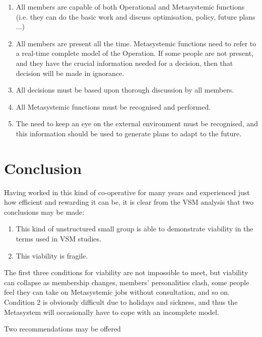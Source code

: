 \begin{enumerate}
  \item All members are capable of both Operational and Metasystemic functions
(i.e. they can do the basic work and discuss optimisation, policy, future plans ...)

  \item All members are present all the time. Metasystemic functions need to refer to a real-time complete model of the Operation. If some people are not present, and they have the crucial information needed for a decision, then that decision will be made in ignorance.

  \item All decisions must be based upon thorough discussion by all members.

  \item All Metasystemic functions must be recognised and performed.

  \item The need to keep an eye on the external environment must be recognised, and this information should be used to generate plans to adapt to the future.

\end{enumerate}

\section*{Conclusion}
Having worked in this kind of co-operative for many years and experienced just how efficient and rewarding it can be, it is clear from the VSM analysis that two conclusions may be made:

\begin{enumerate}
  \item This kind of unstructured small group is able to demonstrate viability in the terms used in VSM studies.

  \item This viability is fragile.

\end{enumerate}

The first three conditions for viability are not impossible to meet, but viability can collapse as membership changes, members' personalities clash, some people feel they can take on Metasystemic jobs without consultation, and so on. Condition 2 is obviously difficult due to holidays and sickness, and thus the Metasystem will occasionally have to cope with an incomplete model.

Two recommendations may be offered

